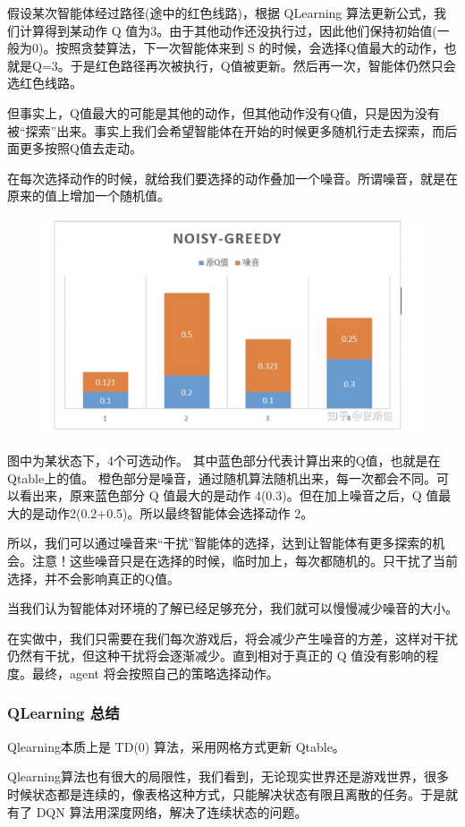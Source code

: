 \documentclass[12pt]{article}
\begin{document}
假设某次智能体经过路径(途中的红色线路)，根据 QLearning 算法更新公式，我们计算得到某动作 Q 值为3。由于其他动作还没执行过，因此他们保持初始值(一般为0)。按照贪婪算法，下一次智能体来到 S 的时候，会选择Q值最大的动作，也就是Q=3。于是红色路径再次被执行，Q值被更新。然后再一次，智能体仍然只会选红色线路。

但事实上，Q值最大的可能是其他的动作，但其他动作没有Q值，只是因为没有被“探索”出来。事实上我们会希望智能体在开始的时候更多随机行走去探索，而后面更多按照Q值去走动。

在每次选择动作的时候，就给我们要选择的动作叠加一个噪音。所谓噪音，就是在原来的值上增加一个随机值。
\begin{figure}[H]
    \centering
    \includegraphics[width=.6\textwidth]{fig/ReinforcementLearning/RL_QLearning_Noisy_Greedy_Add_Noise.png}
\end{figure}
图中为某状态下，4个可选动作。 其中蓝色部分代表计算出来的Q值，也就是在Qtable上的值。 橙色部分是噪音，通过随机算法随机出来，每一次都会不同。可以看出来，原来蓝色部分 Q 值最大的是动作 4(0.3)。但在加上噪音之后，Q 值最大的是动作2(0.2+0.5)。所以最终智能体会选择动作 2。

所以，我们可以通过噪音来“干扰”智能体的选择，达到让智能体有更多探索的机会。注意！这些噪音只是在选择的时候，临时加上，每次都随机的。只干扰了当前选择，并不会影响真正的Q值。

当我们认为智能体对环境的了解已经足够充分，我们就可以慢慢减少噪音的大小。

在实做中，我们只需要在我们每次游戏后，将会减少产生噪音的方差，这样对干扰仍然有干扰，但这种干扰将会逐渐减少。直到相对于真正的 Q 值没有影响的程度。最终，agent 将会按照自己的策略选择动作。


\subsubsection{QLearning 总结}
Qlearning本质上是 TD(0) 算法，采用网格方式更新 Qtable。

Qlearning算法也有很大的局限性，我们看到，无论现实世界还是游戏世界，很多时候状态都是连续的，像表格这种方式，只能解决状态有限且离散的任务。于是就有了 DQN 算法用深度网络，解决了连续状态的问题。
\end{document}
